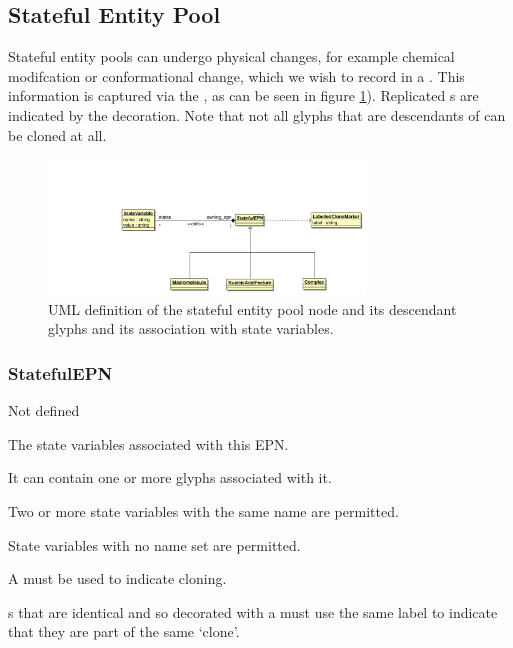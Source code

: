 \subsection{Stateful Entity Pool}

Stateful entity pools can undergo physical changes, for example
chemical modifcation or conformational change, which we wish to record
in a \PDm. This information is captured via the
, as can be seen in figure
\ref{fig:statefulepnuml}). Replicated s are
indicated by the  decoration. Note that
not all glyphs that are descendants of  can be
cloned at all.

\begin{figure}[htb]
  \centering
  \includegraphics[width=0.75\textwidth]{images/statefulepnuml}
\caption{UML definition of the stateful entity pool node and its
  descendant glyphs and its association with state variables.}
  \label{fig:statefulepnuml}
\end{figure}

\subsubsection{StatefulEPN}

\begin{glyphDescription}
\glyphSboTerm Not defined
\begin{glyphIdentity}
   The state variables
  associated with this EPN.
\end{glyphIdentity}
\glyphAux It can contain one or more  glyphs
associated with it.
\glyphRules%
\begin{inparaenum}
\item Two or more state variables with the same name are
  permitted.
\item State variables with no name set are permitted.
\item A  must be used to indicate
  cloning.
\item {}s that are identical and so decorated
  with a  must use the same 
  label to indicate that they are part of the same `clone'.
\end{inparaenum}
\glyphCloning
\end{glyphDescription}

